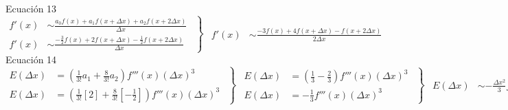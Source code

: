 \documentclass{article}
\begin{document}
Ecuación 13
\tiny
\begin{equation*}
    \left.\begin{aligned}
        f'(x) & \sim \frac{a_{0}f(x)+a_{1}f(x+\Delta x)+a_{2}f(x+2\Delta x)}{\Delta x}
        \\
        f'(x) & \sim \frac{-\frac{3}{2}f(x)+2f(x+\Delta x)-\frac{1}{2}f(x+2\Delta x)}{\Delta x}
    \end{aligned}\hspace{5pt}\right\}\hspace{5pt}\begin{aligned}
        f'(x) & \sim \frac{-3f(x)+4f(x+\Delta x)-f(x+2\Delta x)}{2\Delta x}
    \end{aligned}
\end{equation*}
\normalsize
Ecuación 14
\tiny
\begin{equation*}
    \left.\begin{aligned}
        E(\Delta x) & = \left(\frac{1}{3!}a_{1} + \frac{8}{3!}a_{2}\right)f'''(x)(\Delta x)^{3}
        \\
        E(\Delta x) & = \left(\frac{1}{3!}[2] + \frac{8}{3!}\left[-\frac{1}{2}\right]\right)f'''(x)(\Delta x)^{3}
    \end{aligned}\hspace{5pt}\right\}\hspace{5pt}\left.\begin{aligned}
        E(\Delta x) & = \left(\frac{1}{3} - \frac{2}{3}\right)f'''(x)(\Delta x)^{3}
        \\
        E(\Delta x) & = -\frac{1}{3}f'''(x)(\Delta x)^{3}
    \end{aligned}\hspace{5pt}\right\}\hspace{5pt}\begin{aligned}
        E(\Delta x) & \sim -\frac{\Delta x^{2}}{3}f'''(\xi)
    \end{aligned}
\end{equation*}
\normalsize
\end{document}

